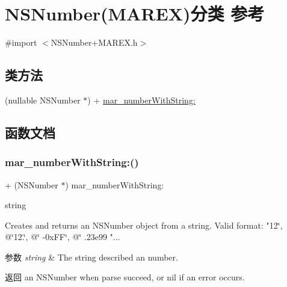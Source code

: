 \hypertarget{category_n_s_number_07_m_a_r_e_x_08}{}\section{N\+S\+Number(M\+A\+R\+EX)分类 参考}
\label{category_n_s_number_07_m_a_r_e_x_08}


{\ttfamily \#import $<$N\+S\+Number+\+M\+A\+R\+E\+X.\+h$>$}

\subsection*{类方法}
\begin{DoxyCompactItemize}
\item 
(nullable N\+S\+Number $\ast$) + \hyperlink{category_n_s_number_07_m_a_r_e_x_08_aae6686e04297aa0df7bc30d71d667487}{mar\+\_\+number\+With\+String\+:}
\end{DoxyCompactItemize}


\subsection{函数文档}
\mbox{\label{category_n_s_number_07_m_a_r_e_x_08_aae6686e04297aa0df7bc30d71d667487}} 
\subsubsection{\texorpdfstring{mar\+\_\+number\+With\+String\+:()}{mar\_numberWithString:()}}
{\footnotesize\ttfamily + (N\+S\+Number $\ast$) mar\+\_\+number\+With\+String\+: \begin{DoxyParamCaption}\item[{(N\+S\+String $\ast$)}]{string }\end{DoxyParamCaption}}

Creates and returns an N\+S\+Number object from a string. Valid format\+: "12\char`\"{}, @\char`\"{}12.\char`\"{}, @\char`\"{} -\/0x\+FF\char`\"{}, @\char`\"{} .23e99 "...


\begin{DoxyParams}{参数}
{\em string} & The string described an number.\\
\hline
\end{DoxyParams}
\begin{DoxyReturn}{返回}
an N\+S\+Number when parse succeed, or nil if an error occurs. 
\end{DoxyReturn}


